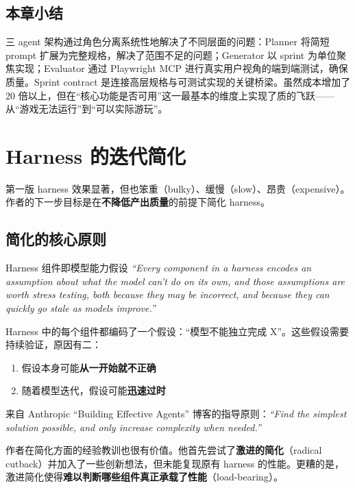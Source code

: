 \documentclass[a4paper]{article}
\begin{document}
\subsection{本章小结}

三 agent 架构通过角色分离系统性地解决了不同层面的问题：Planner 将简短 prompt 扩展为完整规格，解决了范围不足的问题；Generator 以 sprint 为单位聚焦实现；Evaluator 通过 Playwright MCP 进行真实用户视角的端到端测试，确保质量。Sprint contract 是连接高层规格与可测试实现的关键桥梁。虽然成本增加了 20 倍以上，但在``核心功能是否可用''这一最基本的维度上实现了质的飞跃——从``游戏无法运行''到``可以实际游玩''。


\section{Harness 的迭代简化}

第一版 harness 效果显著，但也笨重（bulky）、缓慢（slow）、昂贵（expensive）。作者的下一步目标是在\textbf{不降低产出质量}的前提下简化 harness。

\subsection{简化的核心原则}

\begin{importantbox}{Harness 组件即模型能力假设}
\textit{``Every component in a harness encodes an assumption about what the model can't do on its own, and those assumptions are worth stress testing, both because they may be incorrect, and because they can quickly go stale as models improve.''}

Harness 中的每个组件都编码了一个假设：``模型不能独立完成 X''。这些假设需要持续验证，原因有二：
\begin{enumerate}[leftmargin=1.5em]
    \item 假设本身可能\textbf{从一开始就不正确}
    \item 随着模型迭代，假设可能\textbf{迅速过时}
\end{enumerate}

来自 Anthropic ``Building Effective Agents'' 博客的指导原则：\textit{``Find the simplest solution possible, and only increase complexity when needed.''}
\end{importantbox}

作者在简化方面的经验教训也很有价值。他首先尝试了\textbf{激进的简化}（radical cutback）并加入了一些创新想法，但未能复现原有 harness 的性能。更糟的是，激进简化使得\textbf{难以判断哪些组件真正承载了性能}（load-bearing）。
\end{document}
